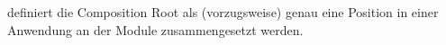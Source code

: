 \textcite[S.~76]{Seemann2012} definiert die Composition Root als (vorzugsweise) genau eine Position in einer Anwendung an der Module zusammengesetzt werden.

\subsection{}